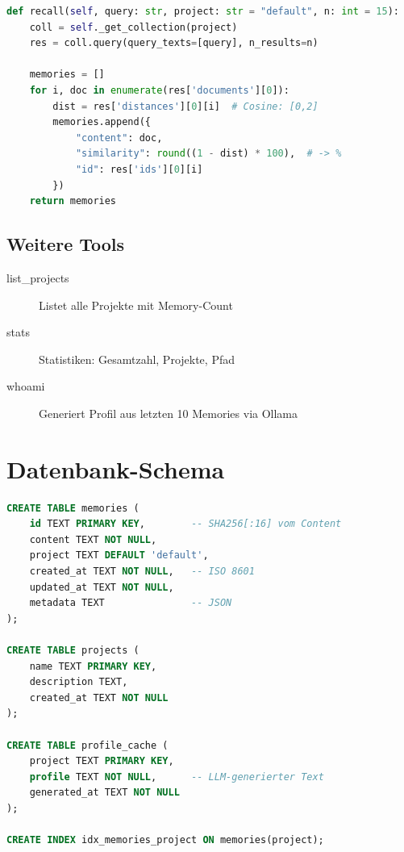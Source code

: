 \documentclass[11pt,a4paper]{article}
\begin{document}
\begin{lstlisting}[style=code,language=Python,caption={store.py -- recall()}]
def recall(self, query: str, project: str = "default", n: int = 15):
    coll = self._get_collection(project)
    res = coll.query(query_texts=[query], n_results=n)
    
    memories = []
    for i, doc in enumerate(res['documents'][0]):
        dist = res['distances'][0][i]  # Cosine: [0,2]
        memories.append({
            "content": doc,
            "similarity": round((1 - dist) * 100),  # -> %
            "id": res['ids'][0][i]
        })
    return memories
\end{lstlisting}

\subsection{Weitere Tools}

\begin{description}
    \item[list\_projects] Listet alle Projekte mit Memory-Count
    \item[stats] Statistiken: Gesamtzahl, Projekte, Pfad
    \item[whoami] Generiert Profil aus letzten 10 Memories via Ollama
\end{description}


\section{Datenbank-Schema}

\begin{lstlisting}[style=code,language=SQL,caption={SQLite Schema}]
CREATE TABLE memories (
    id TEXT PRIMARY KEY,        -- SHA256[:16] vom Content
    content TEXT NOT NULL,
    project TEXT DEFAULT 'default',
    created_at TEXT NOT NULL,   -- ISO 8601
    updated_at TEXT NOT NULL,
    metadata TEXT               -- JSON
);

CREATE TABLE projects (
    name TEXT PRIMARY KEY,
    description TEXT,
    created_at TEXT NOT NULL
);

CREATE TABLE profile_cache (
    project TEXT PRIMARY KEY,
    profile TEXT NOT NULL,      -- LLM-generierter Text
    generated_at TEXT NOT NULL
);

CREATE INDEX idx_memories_project ON memories(project);
\end{lstlisting}
\end{document}
